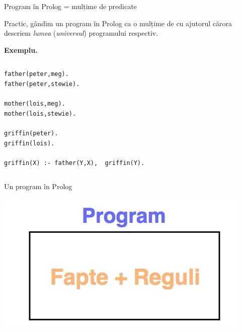 \documentclass[xcolor=pdftex,romanian,colorlinks]{beamer}
\begin{document}
\begin{frame}[fragile]{Program  în Prolog = mulțime de predicate}

Practic, g\^{a}ndim un program  în Prolog ca o mulțime de   cu ajutorul cărora descriem {\it lumea} ({\it universul}) programului respectiv.
 
\textbf{\color{True} Exemplu.}
\begin{columns}
\begin{column}{.5\textwidth}
\vspace{-.2cm}
\begin{verbatim}
father(peter,meg). 
father(peter,stewie).

mother(lois,meg). 
mother(lois,stewie).

griffin(peter).
griffin(lois).

griffin(X) :- father(Y,X),  griffin(Y).
\end{verbatim}
\end{column}
\begin{column}{.3\textwidth}
\\
\\
\\
\end{column}
\end{columns}

\end{frame}


\begin{frame}{Un program în Prolog}

\begin{center}

\includegraphics[scale=.3]{images/Prolog1}


\end{center}


\end{frame}
\end{document}

